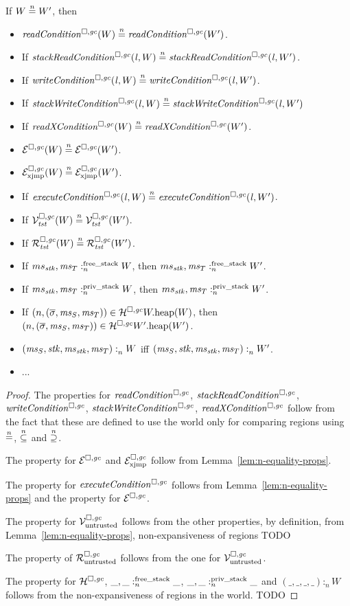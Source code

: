 \begin{lemma}
  \label{lem:non-expansiveness}
  If $W \nequal W'$, then
  \begin{itemize}
  \item $\readCond{W} \nequal \readCond{W'}$.
  \item If $\stackReadCond{\lin,W} \nequal \stackReadCond{\lin,W'}$.
  \item If $\writeCond{\lin,W} \nequal \writeCond{\lin,W'}$.
  \item If $\stackWriteCond{\lin,W} \nequal \stackWriteCond{\lin,W'}$
  \item If $\xReadCond{W} \nequal \xReadCond{W'}$.
  \item $\lre(W) \nequal \lre(W')$.
  \item $\lrexj(W) \nequal \lrexj(W')$.
  \item If $\execCond{\lin,W} \nequal \execCond{\lin,W'}$.
  \item If $\lrvg{\trust}(W) \nequal \lrvg{\trust}(W')$.
  \item If $\lrrg{\trust}(W) \nequal \lrrg{\trust}(W')$.
  \item If $\memSatFStack{ms_\stk,\ms_T}{W}$, then $\memSatFStack{ms_\stk,\ms_T}{W'}$.
  \item If $\memSatStack{ms_\stk,\ms_T}{W}$, then $\memSatStack{ms_\stk,\ms_T}{W'}$.
  \item If $\npair{(\overline{\sigma},\ms_S,\ms_T)} \in \lrheap{\pwheap}(W)$, then $\npair{(\overline{\sigma},\ms_S,\ms_T)} \in \lrheap{\pwheap[W']}(W')$.
  \item $\memSat{(\ms_S,\stk,\ms_\stk,\ms_T)}{W}$ iff $\memSat{(\ms_S,\stk,\ms_\stk,\ms_T)}{W'}$.
  \item ...
  \end{itemize}
\end{lemma}
\begin{proof}
  The properties for $\readCond{}$, $\stackReadCond{}$, $\writeCond{}$, $\stackWriteCond{}$, $\xReadCond{}$ follow from the fact that these are defined to use the world only for comparing regions using $\nequal$, $\nsubeq$ and $\nsupeq$. 

  The property for $\lre$ and $\lrexj$ follow from Lemma~\ref{lem:n-equality-props}.

  The property for $\execCond{}$ follows from Lemma~\ref{lem:n-equality-props} and the property for $\lre$.

  The property for $\lrv$ follows from the other properties, by definition, from Lemma~\ref{lem:n-equality-props}, non-expansiveness of regions 
  TODO

  The property of $\lrr$ follows from the one for $\lrv$.

  The property for $\lrheap$, $\memSatFStack{\_,\_}{\_}$, $\memSatStack{\_,\_}{\_}$ and $(\_,\_,\_,\_) :_n W$ follows from the non-expansiveness of regions in the world. 
  TODO
\end{proof}

